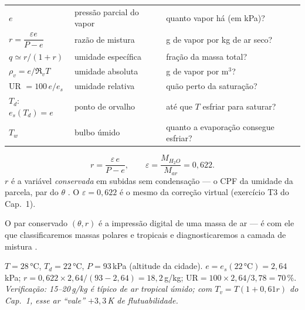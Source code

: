 \documentclass[11pt]{article}
\begin{document}
\begin{noquadro}
\begin{tabular}{lll}
$e$ & pressão parcial do vapor & quanto vapor há (em kPa)?\\
$r = \dfrac{\varepsilon e}{P-e}$ & razão de mistura & g de vapor por kg de
ar seco?\\
$q \simeq r/(1+r)$ & umidade específica & fração da massa total?\\
$\rho_v = e/\Re_v T$ & umidade absoluta & g de vapor por m$^3$?\\
UR $= 100\,e/e_s$ & umidade relativa & quão perto da saturação?\\
$T_d$: $e_s(T_d)=e$ & ponto de orvalho & até que $T$ esfriar para
saturar?\\
$T_w$ & bulbo úmido & quanto a evaporação consegue esfriar?\\
\end{tabular}
\end{noquadro}

\begin{formalivro}
\[ r = \frac{\varepsilon\, e}{P - e},\qquad
\varepsilon = \frac{M_{H_2O}}{M_{ar}} = 0{,}622. \]
$r$ é a variável \emph{conservada} em subidas sem condensação — o CPF da
umidade da parcela, par do $\theta$ .
O $\varepsilon = 0{,}622$ é o mesmo da correção virtual
 (exercício T3 do Cap.~1).
\end{formalivro}


O par conservado $(\theta, r)$ é a impressão digital de uma massa de ar —
é com ele que classificaremos massas polares e tropicais
 e diagnosticaremos a camada de mistura
.

\begin{exemplo}
$T = 28\,°$C, $T_d = 22\,°$C, $P = 93$\,kPa (altitude da cidade).
$e = e_s(22\,°\mathrm{C}) = 2{,}64$\,kPa;
$r = 0{,}622\times2{,}64/(93-2{,}64) = 18{,}2$\,g/kg;
$\mathrm{UR} = 100\times2{,}64/3{,}78 = 70\,\%$.
\emph{Verificação: 15--20\,g/kg é típico de ar tropical úmido; com
$T_v = T(1+0{,}61r)$ do Cap.~1, esse ar ``vale'' $+3{,}3$\,K de
flutuabilidade.}
\end{exemplo}
\end{document}
